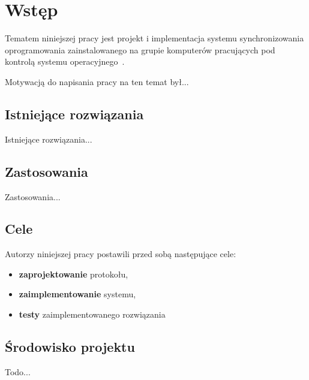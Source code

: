 \documentclass[praca_magisterska]{subfiles}
\begin{document}
\chapter{Wstęp}

Tematem niniejszej pracy jest projekt i implementacja systemu synchronizowania oprogramowania zainstalowanego na grupie komputerów pracujących pod kontrolą systemu operacyjnego~.

Motywacją do napisania pracy na ten temat był...

\section*{Istniejące rozwiązania}

Istniejące rozwiązania...

\section*{Zastosowania}

Zastosowania...

\section{Cele}

\noindent Autorzy niniejszej pracy postawili przed sobą następujące cele:
\begin{itemize}
	\item \textbf{zaprojektowanie} protokołu,
	\item \textbf{zaimplementowanie} systemu,
	\item \textbf{testy} zaimplementowanego rozwiązania
\end{itemize}

\newpage

\section{Środowisko projektu}

Todo...
\newpage
\end{document}

